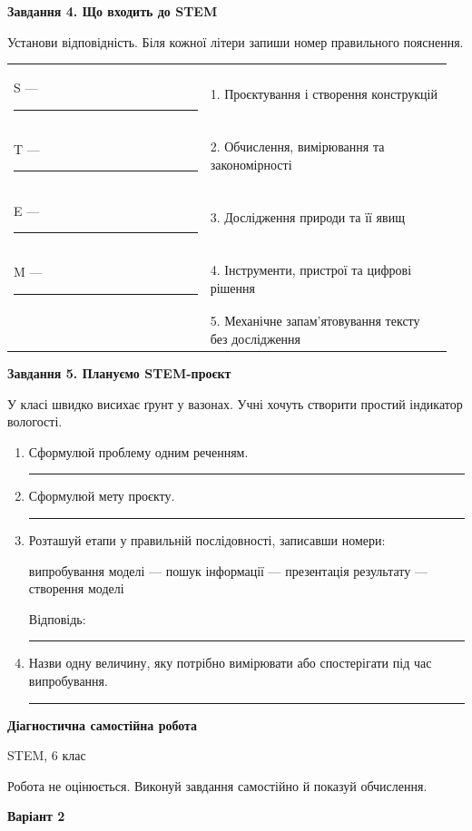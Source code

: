\documentclass[10pt,a4paper]{article}
\newcommand{\answerline}[1]{\par\vspace{2pt}\rule{#1}{0.4pt}}
\begin{document}
\textbf{Завдання 4. Що входить до STEM}

Установи відповідність. Біля кожної літери запиши номер правильного пояснення.

\begin{tabular}{@{}p{0.43\linewidth}p{0.53\linewidth}@{}}
S --- \rule{1cm}{0.4pt} & 1. Проєктування і створення конструкцій\\[3pt]
T --- \rule{1cm}{0.4pt} & 2. Обчислення, вимірювання та закономірності\\[3pt]
E --- \rule{1cm}{0.4pt} & 3. Дослідження природи та її явищ\\[3pt]
M --- \rule{1cm}{0.4pt} & 4. Інструменти, пристрої та цифрові рішення\\[3pt]
& 5. Механічне запам'ятовування тексту без дослідження
\end{tabular}

\textbf{Завдання 5. Плануємо STEM-проєкт}

У класі швидко висихає ґрунт у вазонах. Учні хочуть створити простий індикатор вологості.

\begin{enumerate}[label=\alph*)]
  \item Сформулюй проблему одним реченням.
  \answerline{\linewidth}
  \item Сформулюй мету проєкту.
  \answerline{\linewidth}
  \item Розташуй етапи у правильній послідовності, записавши номери:

  \begin{center}
  випробування моделі --- пошук інформації --- презентація результату --- створення моделі
  \end{center}
  Відповідь: \rule{6cm}{0.4pt}
  \item Назви одну величину, яку потрібно вимірювати або спостерігати під час випробування.
  \answerline{\linewidth}
\end{enumerate}

\newpage

\begin{center}
  {\Large\bfseries Діагностична самостійна робота}\par
  {\large STEM, 6 клас}\par
  \small Робота не оцінюється. Виконуй завдання самостійно й показуй обчислення.
\end{center}

\begin{center}
  {\large\bfseries Варіант 2}
\end{center}
\end{document}
